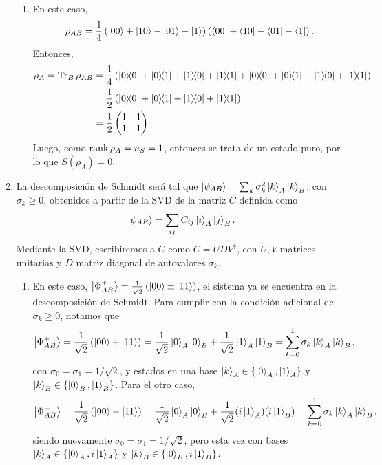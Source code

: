 \documentclass{scrartcl}
\newcommand{\inv}[1]{\frac{1}{#1}}
\DeclareRobustCommand{\[}{\begin{equation}}
\DeclareRobustCommand{\]}{\end{equation}}
\begin{document}
\begin{enumerate}
\begin{enumerate}
        \item En este caso,
        \[ \rho_{AB} = \inv{4} \left( \ket{00} + \ket{10} - \ket{01} - \ket{1} \right) \left( \bra{00} + \bra{10} - \bra{01} - \bra{1} \right). \]
        Entonces,
        \begin{align}
            \rho_A = \Tr_B{\rho_{AB}} &= \inv{4} \left( \dyad{0}{0} + \dyad{0}{1} + \dyad{1}{0} + \dyad{1}{1} + \dyad{0}{0} + \dyad{0}{1} + \dyad{1}{0} + \dyad{1}{1} \right) \\
            &= \inv{2} \left( \dyad{0}{0} + \dyad{0}{1} + \dyad{1}{0} + \dyad{1}{1} \right) \\
            &= \inv{2}
            \begin{pmatrix}
                1 & 1 \\
                1 & 1 \\
            \end{pmatrix}.
        \end{align}
        Luego, como $\rank \rho_A = n_S = 1$, entonces se trata de un estado puro, por lo que $S(\rho_A) = 0$.
    \end{enumerate}
    
    
    
    \item La descomposición de Schmidt será tal que $\ket{\psi_{AB}} = \sum_{k} \sigma_k^2 \ket{k}_A \ket{k}_B$, con $\sigma_k \geq 0$, obtenidos a partir de la SVD de la matriz $C$ definida como
    \[ \ket{\psi_{AB}} = \sum_{ij} C_{ij} \ket{i}_A \ket{j}_B. \]
    Mediante la SVD, escribiremos a $C$ como $C = U D V^\dagger$, con $U, V$ matrices unitarias y $D$ matriz diagonal de autovalores $\sigma_k$.
    \begin{enumerate}
        \item En este caso, $\ket{\Phi_{AB}^{\pm}} = \inv{\sqrt{2}} \left( \ket{00} \pm \ket{11} \right)$, el sistema ya se encuentra en la descomposición de Schmidt. Para cumplir con la condición adicional de $\sigma_k \geq 0$, notamos que
        \[ \ket{\Phi_{AB}^{+}} = \inv{\sqrt{2}} \left( \ket{00} + \ket{11} \right) = \inv{\sqrt{2}} \ket{0}_A \ket{0}_B + \inv{\sqrt{2}} \ket{1}_A \ket{1}_B = \sum_{k = 0}^{1} \sigma_k \ket{k}_A \ket{k}_B, \]
        con $\sigma_0 = \sigma_1 = 1/\sqrt{2}$, y estados en una base $\ket{k}_A \in \{ \ket{0}_A, \ket{1}_A \}$ y $\ket{k}_B \in \{ \ket{0}_B, \ket{1}_B \}$.
        Para el otro caso,
        \[ \ket{\Phi_{AB}^{-}} = \inv{\sqrt{2}} \left( \ket{00} - \ket{11} \right) = \inv{\sqrt{2}} \ket{0}_A \ket{0}_B + \inv{\sqrt{2}} (i\ket{1}_A)(i\ket{1}_B) = \sum_{k = 0}^{1} \sigma_k \ket{k}_A \ket{k}_B, \]
        siendo nuevamente $\sigma_0 = \sigma_1 = 1/\sqrt{2}$, pero esta vez con bases $\ket{k}_A \in \{ \ket{0}_A, i\ket{1}_A \}$ y $\ket{k}_B \in \{ \ket{0}_B, i\ket{1}_B \}$.
        

\end{enumerate}
\end{enumerate}
\end{document}
